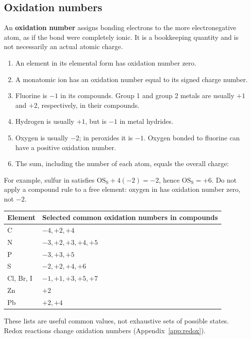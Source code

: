 \documentclass[a4paper,10pt]{article}
\begin{document}
\subsection{Oxidation numbers}
\label{sec:oxidation}
An \textbf{oxidation number} assigns bonding electrons to the more
electronegative atom, as if the bond were completely ionic. It is a bookkeeping
quantity and is not necessarily an actual atomic charge.
\begin{enumerate}
  \item An element in its elemental form has oxidation number zero.
  \item A monatomic ion has an oxidation number equal to its signed charge number.
  \item Fluorine is $-1$ in its compounds. Group 1 and group 2 metals are usually
  $+1$ and $+2$, respectively, in their compounds.
  \item Hydrogen is usually $+1$, but is $-1$ in metal hydrides.
  \item Oxygen is usually $-2$; in peroxides it is $-1$. Oxygen bonded to fluorine
  can have a positive oxidation number.
  \item The sum, including the number of each atom, equals the overall charge:
\end{enumerate}
For example, sulfur in  satisfies
$\mathrm{OS}_{\mathrm S}+4(-2)=-2$, hence $\mathrm{OS}_{\mathrm S}=+6$.
Do not apply a compound rule to a free element: oxygen in  has oxidation
number zero, not $-2$.

\begin{center}
\begin{tabular}{@{}ll@{}}
\toprule
Element & Selected common oxidation numbers in compounds \\
\midrule
C & $-4,+2,+4$ \\
N & $-3,+2,+3,+4,+5$ \\
P & $-3,+3,+5$ \\
S & $-2,+2,+4,+6$ \\
Cl, Br, I & $-1,+1,+3,+5,+7$ \\
Zn & $+2$ \\
Pb & $+2,+4$ \\
\bottomrule
\end{tabular}
\end{center}
These lists are useful common values, not exhaustive sets of possible states.
Redox reactions change oxidation numbers (Appendix~\ref{app:redox}).
\end{document}
